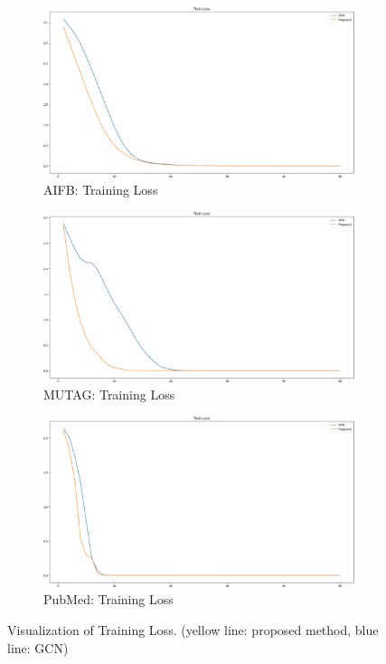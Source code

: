 \documentclass[sigconf]{acmart}
\begin{document}
\begin{figure}[!ht]
    \centering
    \begin{subfigure}{0.45\textwidth}
        \includegraphics[width=\textwidth]{./figs/aifb-loss-2.png}
        \caption{AIFB: Training Loss}
    \end{subfigure}
    \begin{subfigure}{0.45\textwidth}
        \includegraphics[width=\textwidth]{./figs/mutag-loss-2.png}
        \caption{MUTAG: Training Loss}
    \end{subfigure}
    \begin{subfigure}{0.45\textwidth}
        \includegraphics[width=\textwidth]{./figs/pubmed-loss-2.png}
        \caption{PubMed: Training Loss}
    \end{subfigure}
    \caption{Visualization of Training Loss. (yellow line: proposed method, blue line: GCN)}
    \label{fig:loss}
\end{figure}
\end{document}
